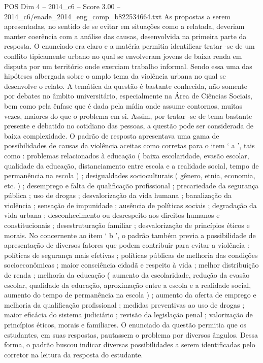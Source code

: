 \begin{textsample}{POS Dim 4 – 2014\_c6 – Score 3.00 – 2014\_c6/enade\_2014\_eng\_comp\_b822534664.txt}
As propostas a serem apresentadas, no sentido de se evitar em situações como a relatada, deveriam manter coerência com a análise das causas, desenvolvida na primeira parte da resposta.
O enunciado era claro e a matéria permitia identificar tratar -se de um conflito tipicamente urbano no qual se envolveram jovens de baixa renda em disputa por um território onde exerciam trabalho informal.
Sendo essa uma das hipóteses albergada sobre o amplo tema da violência urbana no qual se desenvolve o relato.
A temática da questão é bastante conhecida, não somente por debates no âmbito universitário, especialmente na Área de Ciências Sociais, bem como pela ênfase que é dada pela mídia onde assume contornos, muitas vezes, maiores do que o problema em si.
Assim, por tratar -se de tema bastante presente e debatido no cotidiano das pessoas, a questão pode ser considerada de baixa complexidade.
O padrão de resposta apresentava uma gama de possibilidades de causas da violência aceitas como corretas para o item ‘ a ’, tais como : problemas relacionados à educação ( baixa escolaridade, evasão escolar, qualidade da educação, distanciamento entre escola e a realidade social, tempo de permanência na escola ) ; desigualdades socioculturais ( gênero, etnia, economia, etc. ) ; desemprego e falta de qualificação profissional ; precariedade da segurança pública ; uso de drogas ; desvalorização da vida humana ; banalização da violência ; sensação de impunidade ; ausência de políticas sociais ; degradação da vida urbana ; desconhecimento ou desrespeito aos direitos humanos e constitucionais ; desestruturação familiar ; desvalorização de princípios éticos e morais.
No concernente ao item ‘ b ’, o padrão também previa a possibilidade de apresentação de diversos fatores que podem contribuir para evitar a violência : políticas de segurança mais efetivas ; políticas públicas de melhoria das condições socioeconômicas ; maior consciência cidadã e respeito à vida ; melhor distribuição de renda ; melhoria da educação ( aumento da escolaridade, redução da evasão escolar, qualidade da educação, aproximação entre a escola e a realidade social, aumento do tempo de permanência na escola ) ; aumento da oferta de emprego e melhoria da qualificação profissional ; medidas preventivas ao uso de drogas ; maior eficácia do sistema judiciário ; revisão da legislação penal ; valorização de princípios éticos, morais e familiares.
O enunciado da questão permitia que os estudantes, em suas respostas, pautassem o problema por diversos ângulos.
Dessa forma, o padrão buscou indicar diversas possibilidades a serem identificadas pelo corretor na leitura da resposta do estudante.

\end{textsample}
